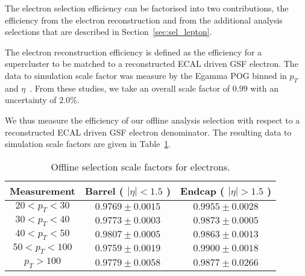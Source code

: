 
The electron selection efficiency can be factorised into two contributions,
the efficiency from the electron reconstruction and from the additional
analysis selections that are described in Section~\ref{sec:sel_lepton}.

The electron reconstruction efficiency is defined as the efficiency for a
supercluster to be matched to a reconstructed ECAL driven GSF electron.
The data to simulation scale factor was measure by the Egamma POG binned in
$p_T$ and $\eta$~\cite{ref:egamma_eff_gsf}. From these studies, we take an overall scale factor of
$0.99$ with an uncertainty of $2.0\%$.

We thus measure the efficiency of our offline analysis selection 
with respect to a reconstructed ECAL driven GSF electron denominator. 
The resulting data to simulation scale factors are given in Table~\ref{tab:eff_ele_offline}.


\begin{table}[!ht]
\begin{center}
\begin{tabular}{c|c|c}
\hline
Measurement & Barrel ( $|\eta|<1.5$ )   & Endcap ( $|\eta|>1.5$ )  \\ 
\hline
$20 < p_T < 30$  & $0.9769 \pm 0.0015$ & $0.9955 \pm 0.0028$  \\ \hline
$30 < p_T < 40$  & $0.9773 \pm 0.0003$ & $0.9873 \pm 0.0005$  \\ \hline
$40 < p_T < 50$  & $0.9807 \pm 0.0005$ & $0.9863 \pm 0.0013$  \\ \hline
$50 < p_T < 100$ & $0.9759 \pm 0.0019$ & $0.9900 \pm 0.0018$  \\ \hline
$p_T > 100$      & $0.9779 \pm 0.0058$ & $0.9877 \pm 0.0266$  \\ \hline 
\end{tabular}
\caption{Offline selection scale factors for electrons.}
\label{tab:eff_ele_offline}
\end{center}
\end{table}

